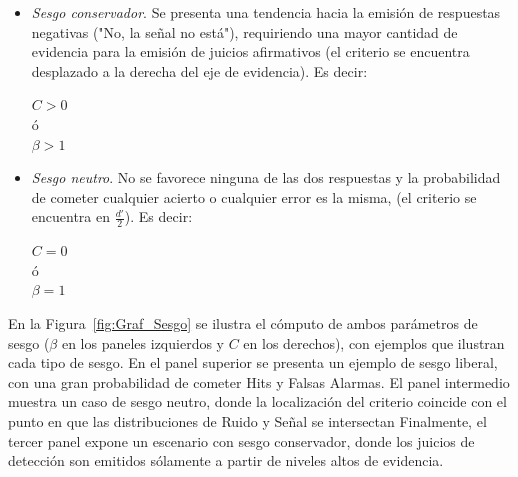 \begin{itemize}
\begin{itemize}
\item \textsl{Sesgo conservador}. Se presenta una tendencia hacia la emisión de respuestas negativas ("No, la señal no está"), requiriendo una mayor cantidad de evidencia para la emisión de juicios afirmativos (el criterio se encuentra desplazado a la derecha del eje de evidencia). Es decir: \\
\begin{center}
$C > 0$\\
ó\\
$\beta > 1$\\
\end{center}

\item \textsl{Sesgo neutro}. No se favorece ninguna de las dos respuestas y la probabilidad de cometer cualquier acierto o cualquier error es la misma, (el criterio se encuentra en $\frac{d'}{2}$). Es decir: \\
\begin{center}
$C = 0$\\
ó\\
$\beta = 1$\\
\end{center}
\end{itemize}

En la Figura~\ref{fig:Graf_Sesgo} se ilustra el cómputo de ambos parámetros de sesgo ($\beta$ en los paneles izquierdos y $C$ en los derechos), con ejemplos que ilustran cada tipo de sesgo. En el panel superior se presenta un ejemplo de sesgo liberal, con una gran probabilidad de cometer Hits y Falsas Alarmas. El panel intermedio muestra un caso de sesgo neutro, donde la localización del criterio coincide con el punto en que las distribuciones de Ruido y Señal se intersectan Finalmente, el tercer panel expone un escenario con sesgo conservador, donde los juicios de detección son emitidos sólamente a partir de niveles altos de evidencia.\\


\end{itemize}
